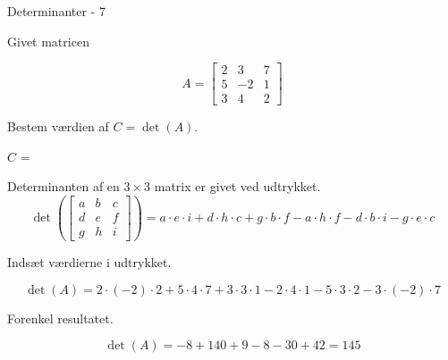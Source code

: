 \documentclass{article}
\begin{document}
\begin{exercise}{Determinanter - 7}
	
	Givet matricen
	
	\[
	A = \left[\begin{array}{rrr}
	2 & 3 & 7 \\ 
	5 & -2 & 1 \\
	3 & 4 & 2
	\end{array} \right]
	\]
	
	Bestem værdien af $C = \det(A)$.
	
	$C$ = 
	
	\hint
	Determinanten af en $3 \times 3$ matrix er givet ved udtrykket.
	\[
	\det \left( \left[\begin{array}{rrr}
	a & b & c \\ 
	d & e & f \\
	g & h & i
	\end{array} \right] \right) = a \cdot e \cdot i + d \cdot h \cdot c + g \cdot b \cdot f - a \cdot h \cdot f - d \cdot b \cdot i - g \cdot e \cdot c
	\]
	
	\hint
	Indsæt værdierne i udtrykket.
	
	\hint
	\[
	\det \left( A \right) = 2 \cdot (-2) \cdot 2 + 5 \cdot 4 \cdot 7 + 3 \cdot 3 \cdot 1 - 2 \cdot 4 \cdot 1 - 5 \cdot 3 \cdot 2 - 3 \cdot (-2) \cdot 7
	\]
	
	\hint
	Forenkel resultatet.
	
	\hint
	\[
	\det \left( A \right) = -8 + 140 + 9 - 8 -30 + 42 = 145
	\]
	
\end{exercise}
\end{document}
